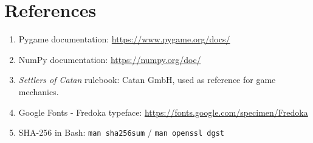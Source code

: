 \documentclass[12pt,a4paper]{article}
\begin{document}
\section*{References}

\begin{enumerate}[leftmargin=2em]
  \item Pygame documentation: \url{https://www.pygame.org/docs/}
  \item NumPy documentation: \url{https://numpy.org/doc/}
  \item \textit{Settlers of Catan} rulebook: Catan GmbH, used as reference for game mechanics.
  \item Google Fonts - Fredoka typeface: \url{https://fonts.google.com/specimen/Fredoka}
  \item SHA-256 in Bash: \texttt{man sha256sum} / \texttt{man openssl dgst}
\end{enumerate}
\end{document}
